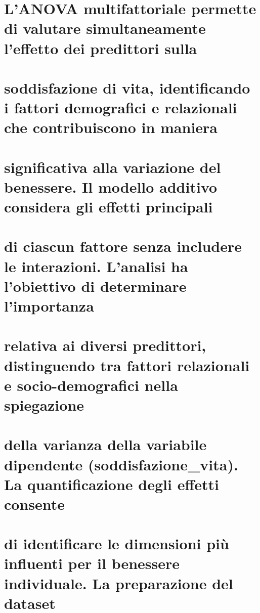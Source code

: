 \documentclass[
]{article}
\begin{document}
\section{L'ANOVA multifattoriale permette di valutare simultaneamente
l'effetto dei predittori
sulla}\label{lanova-multifattoriale-permette-di-valutare-simultaneamente-leffetto-dei-predittori-sulla}

\section{soddisfazione di vita, identificando i fattori demografici e
relazionali che contribuiscono in
maniera}\label{soddisfazione-di-vita-identificando-i-fattori-demografici-e-relazionali-che-contribuiscono-in-maniera}

\section{significativa alla variazione del benessere. Il modello
additivo considera gli effetti
principali}\label{significativa-alla-variazione-del-benessere.-il-modello-additivo-considera-gli-effetti-principali}

\section{di ciascun fattore senza includere le interazioni. L'analisi ha
l'obiettivo di determinare
l'importanza}\label{di-ciascun-fattore-senza-includere-le-interazioni.-lanalisi-ha-lobiettivo-di-determinare-limportanza}

\section{relativa ai diversi predittori, distinguendo tra fattori
relazionali e socio-demografici nella
spiegazione}\label{relativa-ai-diversi-predittori-distinguendo-tra-fattori-relazionali-e-socio-demografici-nella-spiegazione}

\section{della varianza della variabile dipendente
(soddisfazione\_vita). La quantificazione degli effetti
consente}\label{della-varianza-della-variabile-dipendente-soddisfazione_vita.-la-quantificazione-degli-effetti-consente}

\section{di identificare le dimensioni più influenti per il benessere
individuale. La preparazione del
dataset}\label{di-identificare-le-dimensioni-piuxf9-influenti-per-il-benessere-individuale.-la-preparazione-del-dataset}
\end{document}
